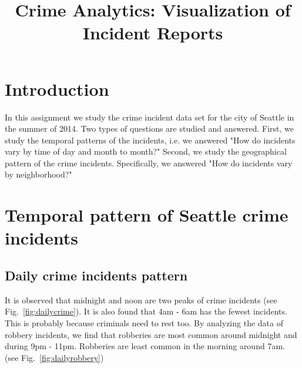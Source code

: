 \documentclass[a4paper]{article}
\title{Crime Analytics: Visualization of Incident Reports}
\begin{document}
\maketitle


\section{Introduction}
In this assignment we study the crime incident data set for the city of Seattle in the summer of 2014. Two types of questions are studied and answered. First, we study the temporal patterns of the incidents, i.e. we answered "How do incidents vary by time of day and month to month?" Second, we study the geographical pattern of the crime incidents. Specifically, we answered "How do incidents vary by neighborhood?"

\section{Temporal pattern of Seattle crime incidents}
	\subsection{Daily crime incidents pattern}


It is observed that midnight and noon are two peaks of crime incidents (see Fig.~\ref{fig:dailycrime}). It is also found that 4am - 6am has the fewest incidents. This is probably because criminals need to rest too. By analyzing the data of robbery incidents, we find that robberies are most common around midnight and during 9pm - 11pm. Robberies are least common in the morning around 7am. (see Fig.~\ref{fig:dailyrobbery})
\end{document}
